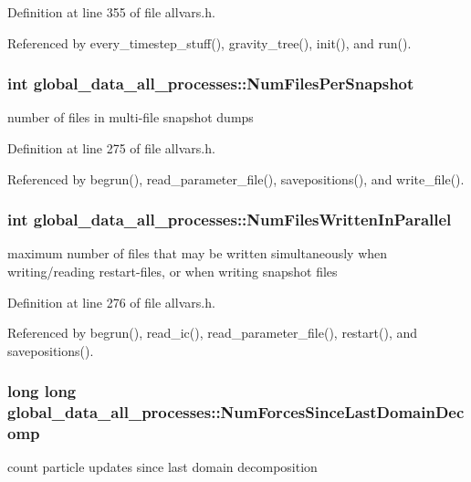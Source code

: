 Definition at line 355 of file allvars.h.



Referenced by every\_\-timestep\_\-stuff(), gravity\_\-tree(), init(), and run().

\hypertarget{structglobal__data__all__processes_a3749135400fbf51c319054233d7a64a7}{
\subsubsection[{NumFilesPerSnapshot}]{\setlength{\rightskip}{0pt plus 5cm}int {\bf global\_\-data\_\-all\_\-processes::NumFilesPerSnapshot}}}
\label{structglobal__data__all__processes_a3749135400fbf51c319054233d7a64a7}
number of files in multi-\/file snapshot dumps 

Definition at line 275 of file allvars.h.



Referenced by begrun(), read\_\-parameter\_\-file(), savepositions(), and write\_\-file().

\hypertarget{structglobal__data__all__processes_a0e328240a1fb59c7bf55332a1a691029}{
\subsubsection[{NumFilesWrittenInParallel}]{\setlength{\rightskip}{0pt plus 5cm}int {\bf global\_\-data\_\-all\_\-processes::NumFilesWrittenInParallel}}}
\label{structglobal__data__all__processes_a0e328240a1fb59c7bf55332a1a691029}
maximum number of files that may be written simultaneously when writing/reading restart-\/files, or when writing snapshot files 

Definition at line 276 of file allvars.h.



Referenced by begrun(), read\_\-ic(), read\_\-parameter\_\-file(), restart(), and savepositions().

\hypertarget{structglobal__data__all__processes_a64e0b5f35f25dd09297bc41acf0502f7}{
\subsubsection[{NumForcesSinceLastDomainDecomp}]{\setlength{\rightskip}{0pt plus 5cm}long long {\bf global\_\-data\_\-all\_\-processes::NumForcesSinceLastDomainDecomp}}}
\label{structglobal__data__all__processes_a64e0b5f35f25dd09297bc41acf0502f7}
count particle updates since last domain decomposition 

